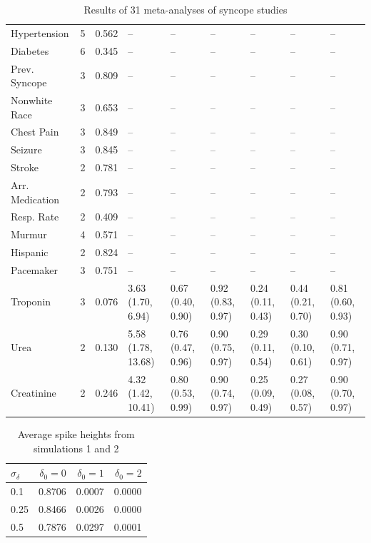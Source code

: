 \documentclass[AMA,STIX1COL]{WileyNJD-v2}
\begin{document}
\begin{table}
\begin{tabular}{lllllllll}
  Hypertension & 5 & 0.562 & -- & -- & -- & -- & -- & -- \\ 
  Diabetes & 6 & 0.345 & -- & -- & -- & -- & -- & -- \\ 
  Prev. Syncope & 3 & 0.809 & -- & -- & -- & -- & -- & -- \\ 
  Nonwhite Race & 3 & 0.653 & -- & -- & -- & -- & -- & -- \\ 
  Chest Pain & 3 & 0.849 & -- & -- & -- & -- & -- & -- \\ 
  Seizure & 3 & 0.845 & -- & -- & -- & -- & -- & -- \\ 
  Stroke & 2 & 0.781 & -- & -- & -- & -- & -- & -- \\ 
  Arr. Medication & 2 & 0.793 & -- & -- & -- & -- & -- & -- \\ 
  Resp. Rate & 2 & 0.409 & -- & -- & -- & -- & -- & -- \\ 
  Murmur & 4 & 0.571 & -- & -- & -- & -- & -- & -- \\ 
  Hispanic & 2 & 0.824 & -- & -- & -- & -- & -- & -- \\ 
  Pacemaker & 3 & 0.751 & -- & -- & -- & -- & -- & -- \\ 
  Troponin & 3 & 0.076 & 3.63 (1.70, 6.94) & 0.67 (0.40, 0.90) & 0.92 (0.83, 0.97) & 0.24 (0.11, 0.43) & 0.44 (0.21, 0.70) & 0.81 (0.60, 0.93) \\ 
  Urea & 2 & 0.130 & 5.58 (1.78, 13.68) & 0.76 (0.47, 0.96) & 0.90 (0.75, 0.97) & 0.29 (0.11, 0.54) & 0.30 (0.10, 0.61) & 0.90 (0.71, 0.97) \\ 
  Creatinine & 2 & 0.246 & 4.32 (1.42, 10.41) & 0.80 (0.53, 0.99) & 0.90 (0.74, 0.97) & 0.25 (0.09, 0.49) & 0.27 (0.08, 0.57) & 0.90 (0.70, 0.97) \\ 
   \hline
\end{tabular}
\caption{Results of 31 meta-analyses of syncope studies} 
\label{table:syncope}
\end{table}

\clearpage 

\begin{table}[ht]
\centering
\begin{tabular}{lrrr}
  \hline
 $\sigma_\delta$ & $\delta_0 = 0$ & $\delta_0 = 1$ & $\delta_0 = 2$ \\ 
  \hline
0.1 & 0.8706 & 0.0007 & 0.0000 \\ 
  0.25 & 0.8466 & 0.0026 & 0.0000 \\ 
  0.5& 0.7876 & 0.0297 & 0.0001 \\ 
   \hline
\end{tabular}
\caption{Average spike heights from simulations 1 and 2} 
\label{table:spike-height}
\end{table}
\end{document}
